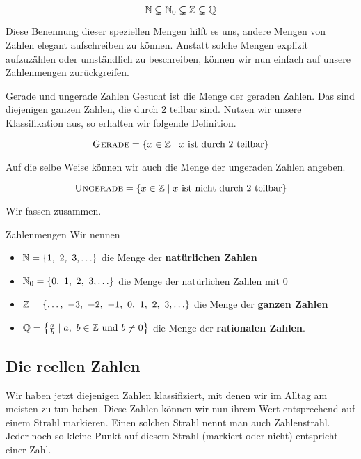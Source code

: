 \documentclass[../../main.tex]{subfiles}
\begin{document}
	$$\mathbb{N} \subsetneq \mathbb{N}_0 \subsetneq \mathbb{Z} \subsetneq \mathbb{Q}$$
	
	Diese Benennung dieser speziellen Mengen hilft es uns, andere Mengen von Zahlen elegant aufschreiben zu können. Anstatt solche Mengen explizit aufzuzählen oder umständlich zu beschreiben, können wir nun einfach auf unsere Zahlenmengen zurückgreifen.

	\begin{example}{Gerade und ungerade Zahlen}
		Gesucht ist die Menge der geraden Zahlen. Das sind diejenigen ganzen Zahlen, die durch $2$ teilbar sind. Nutzen wir unsere Klassifikation aus, so erhalten wir folgende Definition.
		
		$$\textsc{Gerade} = \left\{x\in\mathbb{Z} \mid x \text{ ist durch $2$ teilbar}\right\}$$
		
		Auf die selbe Weise können wir auch die Menge der ungeraden Zahlen angeben.
		
		$$\textsc{Ungerade} = \left\{x\in\mathbb{Z} \mid x \text{ ist nicht durch $2$ teilbar}\right\}$$
	\end{example}
	
	Wir fassen zusammen.
	
	\begin{definition}{Zahlenmengen}
		Wir nennen
		\begin{itemize}
			\item $\mathbb{N} = \left\{1,\ 2,\ 3,\ldots \right\}$ die Menge der \textbf{natürlichen Zahlen}
			\item $\Natural_0 = \left\{0, \ 1,\ 2,\ 3,\ldots \right\}$ die Menge der natürlichen Zahlen mit $0$
			\item $\mathbb{Z} = \left\{\ldots, \ -3, \ -2, \ -1, \ 0, \ 1, \ 2, \ 3, \ldots \right\}$ die Menge der \textbf{ganzen Zahlen}
			\item $\mathbb{Q} = \left\{ \frac{a}{b} \mid a, \ b \in \mathbb{Z} \text{ und } b \neq 0\right\}$ die Menge der \textbf{rationalen Zahlen}.
		\end{itemize}
	\end{definition}

	\subsection{Die reellen Zahlen}
	Wir haben jetzt diejenigen Zahlen klassifiziert, mit denen wir im Alltag am meisten zu tun haben. Diese Zahlen können wir nun ihrem Wert entsprechend auf einem Strahl markieren. Einen solchen Strahl nennt man auch Zahlenstrahl. Jeder noch so kleine Punkt auf diesem Strahl (markiert oder nicht) entspricht einer Zahl.
	
\end{document}
